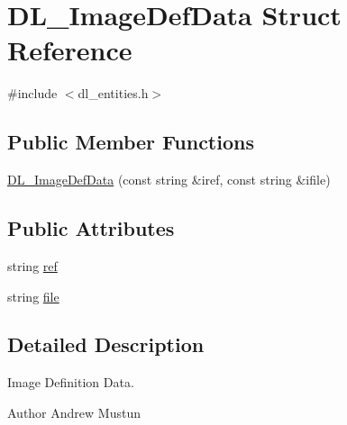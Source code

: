 \hypertarget{structDL__ImageDefData}{\section{D\-L\-\_\-\-Image\-Def\-Data Struct Reference}
\label{structDL__ImageDefData}
}


{\ttfamily \#include $<$dl\-\_\-entities.\-h$>$}

\subsection*{Public Member Functions}
\begin{DoxyCompactItemize}
\item 
\hyperlink{structDL__ImageDefData_a12b82b05affe54d49008b28a7caa9e75}{D\-L\-\_\-\-Image\-Def\-Data} (const string \&iref, const string \&ifile)
\end{DoxyCompactItemize}
\subsection*{Public Attributes}
\begin{DoxyCompactItemize}
\item 
string \hyperlink{structDL__ImageDefData_a73ce11b60c8aae768e94426ece5ef9cb}{ref}
\item 
string \hyperlink{structDL__ImageDefData_a57a363ce7509f5472df4b80d7c5cff79}{file}
\end{DoxyCompactItemize}


\subsection{Detailed Description}
Image Definition Data.

\begin{DoxyAuthor}{Author}
Andrew Mustun 
\end{DoxyAuthor}


